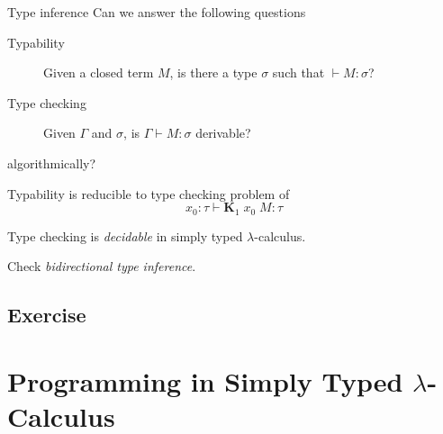 \begin{frame}{Type inference}
  Can we answer the following questions
  \begin{description}
    \item[Typability] Given a closed term $M$, is there a type $\sigma$
      such that $\vdash M : \sigma$? 
    \item[Type checking] Given $\Gamma$ and $\sigma$, is $\Gamma \vdash M : \sigma$ derivable?
  \end{description}
  algorithmically?
  
  Typability is reducible to type checking problem of
  \[
    x_0: \tau \vdash \textbf{K}_1\;x_0\;M : \tau
  \]

  \begin{theorem}
    Type checking is \emph{decidable}
    in simply typed $\lambda$-calculus.
  \end{theorem}

Check \emph{bidirectional type inference}.
\subsection*{Exercise}
  
\end{frame}

\section{Programming in Simply Typed $\lambda$-Calculus}

